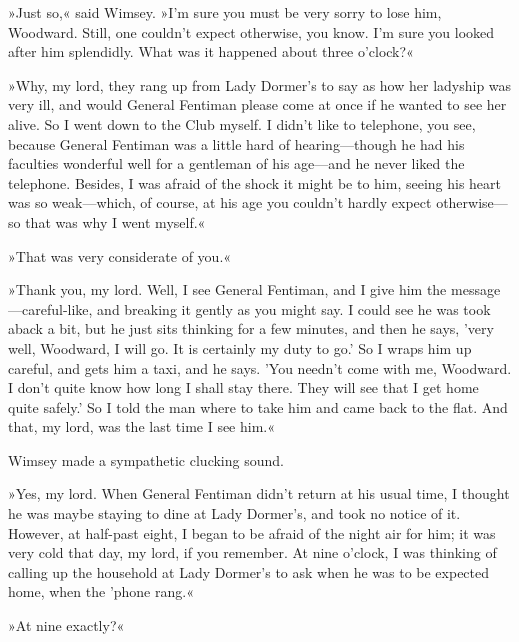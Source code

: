 »Just so,« said Wimsey. »I'm sure you must be very sorry to lose him, Woodward. Still, one couldn't expect otherwise, you know. I'm sure you looked after him splendidly. What was it happened about three o'clock?«

»Why, my lord, they rang up from Lady Dormer's to say as how her ladyship was very ill, and would General Fentiman please come at once if he wanted to see her alive. So I went down to the Club myself. I didn't like to telephone, you see, because General Fentiman was a little hard of hearing\allowbreak---\allowbreak though he had his faculties wonderful well for a gentleman of his age\allowbreak---\allowbreak and he never liked the telephone. Besides, I was afraid of the shock it might be to him, seeing his heart was so weak\allowbreak---\allowbreak which, of course, at his age you couldn't hardly expect otherwise\allowbreak---\allowbreak so that was why I went myself.«

»That was very considerate of you.«

»Thank you, my lord. Well, I see General Fentiman, and I give him the message\allowbreak---\allowbreak careful-like, and breaking it gently as you might say. I could see he was took aback a bit, but he just sits thinking for a few minutes, and then he says, 'very well, Woodward, I will go. It is certainly my duty to go.' So I wraps him up careful, and gets him a taxi, and he says. 'You needn't come with me, Woodward. I don't quite know how long I shall stay there. They will see that I get home quite safely.' So I told the man where to take him and came back to the flat. And that, my lord, was the last time I see him.«

Wimsey made a sympathetic clucking sound.

»Yes, my lord. When General Fentiman didn't return at his usual time, I thought he was maybe staying to dine at Lady Dormer's, and took no notice of it. However, at half-past eight, I began to be afraid of the night air for him; it was very cold that day, my lord, if you remember. At nine o'clock, I was thinking of calling up the household at Lady Dormer's to ask when he was to be expected home, when the 'phone rang.«

»At nine exactly?«

